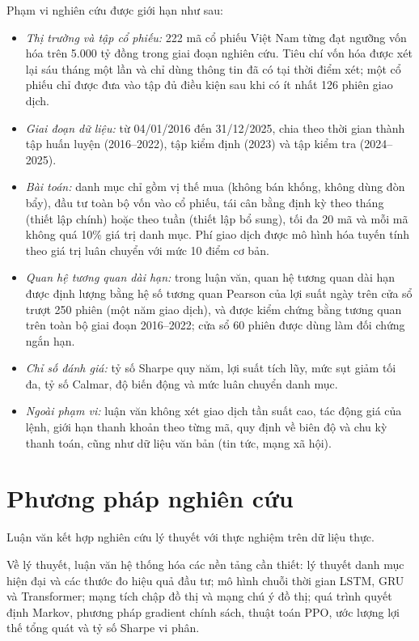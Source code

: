 Phạm vi nghiên cứu được giới hạn như sau:
\begin{itemize}
  \item \textit{Thị trường và tập cổ phiếu:} 222 mã cổ phiếu Việt Nam từng đạt ngưỡng vốn hóa trên 5.000 tỷ đồng trong giai đoạn nghiên cứu. Tiêu chí vốn hóa được xét lại sáu tháng một lần và chỉ dùng thông tin đã có tại thời điểm xét; một cổ phiếu chỉ được đưa vào tập đủ điều kiện sau khi có ít nhất 126 phiên giao dịch.
  \item \textit{Giai đoạn dữ liệu:} từ 04/01/2016 đến 31/12/2025, chia theo thời gian thành tập huấn luyện (2016--2022), tập kiểm định (2023) và tập kiểm tra (2024--2025).
  \item \textit{Bài toán:} danh mục chỉ gồm vị thế mua (không bán khống, không dùng đòn bẩy), đầu tư toàn bộ vốn vào cổ phiếu, tái cân bằng định kỳ theo tháng (thiết lập chính) hoặc theo tuần (thiết lập bổ sung), tối đa 20 mã và mỗi mã không quá 10\% giá trị danh mục. Phí giao dịch được mô hình hóa tuyến tính theo giá trị luân chuyển với mức 10 điểm cơ bản.
  \item \textit{Quan hệ tương quan dài hạn:} trong luận văn, quan hệ tương quan dài hạn được định lượng bằng hệ số tương quan Pearson của lợi suất ngày trên cửa sổ trượt 250 phiên (một năm giao dịch), và được kiểm chứng bằng tương quan trên toàn bộ giai đoạn 2016--2022; cửa sổ 60 phiên được dùng làm đối chứng ngắn hạn.
  \item \textit{Chỉ số đánh giá:} tỷ số Sharpe quy năm, lợi suất tích lũy, mức sụt giảm tối đa, tỷ số Calmar, độ biến động và mức luân chuyển danh mục.
  \item \textit{Ngoài phạm vi:} luận văn không xét giao dịch tần suất cao, tác động giá của lệnh, giới hạn thanh khoản theo từng mã, quy định về biên độ và chu kỳ thanh toán, cũng như dữ liệu văn bản (tin tức, mạng xã hội).
\end{itemize}

\section*{Phương pháp nghiên cứu}

Luận văn kết hợp nghiên cứu lý thuyết với thực nghiệm trên dữ liệu thực.

Về lý thuyết, luận văn hệ thống hóa các nền tảng cần thiết: lý thuyết danh mục hiện đại và các thước đo hiệu quả đầu tư; mô hình chuỗi thời gian LSTM, GRU và Transformer; mạng tích chập đồ thị và mạng chú ý đồ thị; quá trình quyết định Markov, phương pháp gradient chính sách, thuật toán PPO, ước lượng lợi thế tổng quát và tỷ số Sharpe vi phân.

